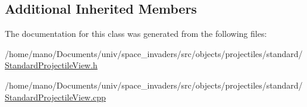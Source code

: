\subsection*{Additional Inherited Members}


The documentation for this class was generated from the following files\+:\begin{DoxyCompactItemize}
\item 
/home/mano/\+Documents/univ/space\+\_\+invaders/src/objects/projectiles/standard/\hyperlink{StandardProjectileView_8h}{Standard\+Projectile\+View.\+h}\item
/home/mano/\+Documents/univ/space\+\_\+invaders/src/objects/projectiles/standard/\hyperlink{StandardProjectileView_8cpp}{Standard\+Projectile\+View.\+cpp}\end{DoxyCompactItemize}
